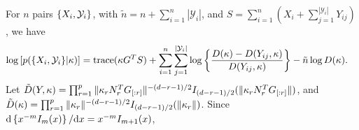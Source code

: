 
For $n$ pairs $\{X_i, \mathcal{Y}_i\}$, %
with $\tilde{n} = n + \sum_{i=1}^n |\mathcal{Y}_i|$, and
$S = \sum_{i=1}^n(X_i + \sum_{j=1}^{|\mathcal{Y}_i|} Y_{ij})$, we have %
\begin{align}
  \log\left[p(\{X_i,\cY_i\}|\bkappa)\right] &= \text{trace}(\bkappa G^T S) +\sum_{i=1}^n \sum_{j=1}^{|\cY_i|} \log \left\{\frac{D(\bkappa) - D(Y_{ij}, \bkappa) }{  %
  D(Y_{ij}, \bkappa)}\right\} - \tilde{n} \log D(\bkappa). \nonumber
\end{align}
Let $\tilde{D}(Y, \kappa) =
{\prod_{r=1}^p { \|\kappa_r N^T_r G_{[:r]} \|^{-(d-r-1)/2 }}{ I_{(d-r-1)/2}(\| \kappa_r N^T_r G_{[:r]} \|)} }$, and %
 $\tilde{D}(\kappa) =
 {\prod_{r=1}^p { \|\kappa_r \|^{-(d-r-1)/2 }}{ I_{(d-r-1)/2}(\| \kappa_r \|)} }$.
 Since ${\mathrm{d} }\left\{{x^{-m}}{I_m(x)} \right\}/{\mathrm{d} x}= x^{-m}I_{m+1}(x)$, 
